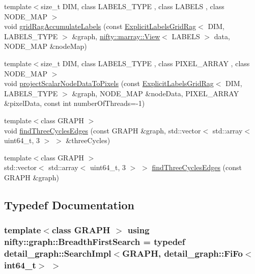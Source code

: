 \begin{DoxyCompactItemize}
{\footnotesize template$<$size\+\_\+t D\+I\+M, class L\+A\+B\+E\+L\+S\+\_\+\+T\+Y\+P\+E , class L\+A\+B\+E\+L\+S , class N\+O\+D\+E\+\_\+\+M\+A\+P $>$ }\\void \hyperlink{namespacenifty_1_1graph_a079406a55f43b7ea55616943a3bc6fff}{grid\+Rag\+Accumulate\+Labels} (const \hyperlink{namespacenifty_1_1graph_a45cca2dcd061996d13ec8e6bb8afb200}{Explicit\+Labels\+Grid\+Rag}$<$ D\+I\+M, L\+A\+B\+E\+L\+S\+\_\+\+T\+Y\+P\+E $>$ \&graph, \hyperlink{classandres_1_1View}{nifty\+::marray\+::\+View}$<$ L\+A\+B\+E\+L\+S $>$ data, N\+O\+D\+E\+\_\+\+M\+A\+P \&node\+Map)
\item 
{\footnotesize template$<$size\+\_\+t D\+I\+M, class L\+A\+B\+E\+L\+S\+\_\+\+T\+Y\+P\+E , class P\+I\+X\+E\+L\+\_\+\+A\+R\+R\+A\+Y , class N\+O\+D\+E\+\_\+\+M\+A\+P $>$ }\\void \hyperlink{namespacenifty_1_1graph_a6b3a3f0cacf4a06ba0b45afc3fb9bc08}{project\+Scalar\+Node\+Data\+To\+Pixels} (const \hyperlink{namespacenifty_1_1graph_a45cca2dcd061996d13ec8e6bb8afb200}{Explicit\+Labels\+Grid\+Rag}$<$ D\+I\+M, L\+A\+B\+E\+L\+S\+\_\+\+T\+Y\+P\+E $>$ \&graph, N\+O\+D\+E\+\_\+\+M\+A\+P \&node\+Data, P\+I\+X\+E\+L\+\_\+\+A\+R\+R\+A\+Y \&pixel\+Data, const int number\+Of\+Threads=-\/1)
\item 
{\footnotesize template$<$class G\+R\+A\+P\+H $>$ }\\void \hyperlink{namespacenifty_1_1graph_a2ae7ba3bc963090781fd1cafd70ac800}{find\+Three\+Cycles\+Edges} (const G\+R\+A\+P\+H \&graph, std\+::vector$<$ std\+::array$<$ uint64\+\_\+t, 3 $>$ $>$ \&three\+Cycles)
\item 
{\footnotesize template$<$class G\+R\+A\+P\+H $>$ }\\std\+::vector$<$ std\+::array$<$ uint64\+\_\+t, 3 $>$ $>$ \hyperlink{namespacenifty_1_1graph_ad3135898f4d621d7b498e65c7b5f38c1}{find\+Three\+Cycles\+Edges} (const G\+R\+A\+P\+H \&graph)
\end{DoxyCompactItemize}


\subsection{Typedef Documentation}
\hypertarget{namespacenifty_1_1graph_a5cdea7eb940a178738d5f7ba11b92a15}{}
\subsubsection[{Breadth\+First\+Search}]{\setlength{\rightskip}{0pt plus 5cm}template$<$class G\+R\+A\+P\+H $>$ using {\bf nifty\+::graph\+::\+Breadth\+First\+Search} = typedef {\bf detail\+\_\+graph\+::\+Search\+Impl}$<$G\+R\+A\+P\+H, {\bf detail\+\_\+graph\+::\+Fi\+Fo}$<$int64\+\_\+t$>$ $>$}\label{namespacenifty_1_1graph_a5cdea7eb940a178738d5f7ba11b92a15}
\hypertarget{namespacenifty_1_1graph_a3d6d4a5216a5d0a11785373bc7537085}{}
